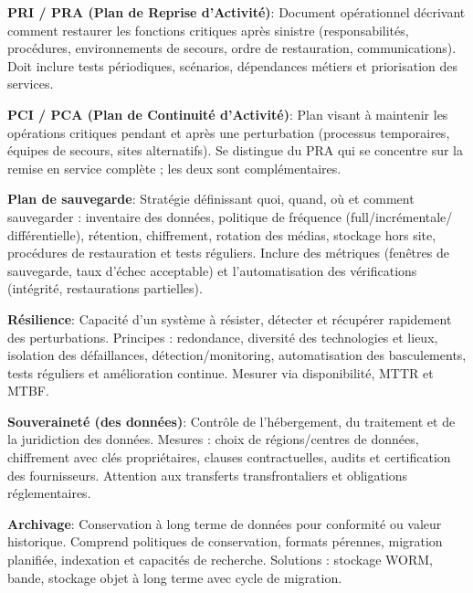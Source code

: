 \vspace{0.5cm}

\noindent \textbf{PRI / PRA (Plan de Reprise d'Activité)}:
Document opérationnel décrivant comment restaurer les fonctions critiques après sinistre (responsabilités, procédures, environnements de secours, ordre de restauration, communications). Doit inclure tests périodiques, scénarios, dépendances métiers et priorisation des services.

\vspace{0.5cm}

\noindent \textbf{PCI / PCA (Plan de Continuité d'Activité)}:
Plan visant à maintenir les opérations critiques pendant et après une perturbation (processus temporaires, équipes de secours, sites alternatifs). Se distingue du PRA qui se concentre sur la remise en service complète ; les deux sont complémentaires.

\vspace{0.5cm}

\noindent \textbf{Plan de sauvegarde}:
Stratégie définissant quoi, quand, où et comment sauvegarder : inventaire des données, politique de fréquence (full/incrémentale/ différentielle), rétention, chiffrement, rotation des médias, stockage hors site, procédures de restauration et tests réguliers. Inclure des métriques (fenêtres de sauvegarde, taux d'échec acceptable) et l'automatisation des vérifications (intégrité, restaurations partielles).

\vspace{0.5cm}

\noindent \textbf{Résilience}:
Capacité d'un système à résister, détecter et récupérer rapidement des perturbations. Principes : redondance, diversité des technologies et lieux, isolation des défaillances, détection/monitoring, automatisation des basculements, tests réguliers et amélioration continue. Mesurer via disponibilité, MTTR et MTBF.

\vspace{0.5cm}

\noindent \textbf{Souveraineté (des données)}:
Contrôle de l'hébergement, du traitement et de la juridiction des données. Mesures : choix de régions/centres de données, chiffrement avec clés propriétaires, clauses contractuelles, audits et certification des fournisseurs. Attention aux transferts transfrontaliers et obligations réglementaires.

\vspace{0.5cm}

\noindent \textbf{Archivage}:
Conservation à long terme de données pour conformité ou valeur historique. Comprend politiques de conservation, formats pérennes, migration planifiée, indexation et capacités de recherche. Solutions : stockage WORM, bande, stockage objet à long terme avec cycle de migration.

